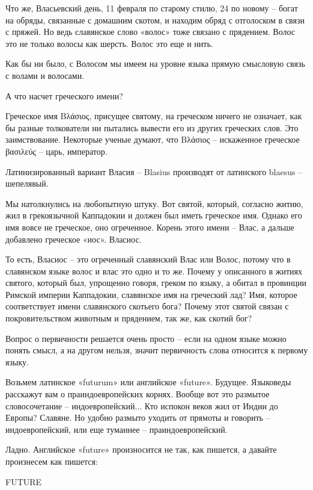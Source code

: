 \documentclass[a5paper,11pt,openany]{article}
\begin{document}
  Что же, Власьевский день, 11 февраля по старому стилю, 24 по новому – богат на обряды, связанные с домашним скотом, и находим обряд с отголоском в связи с пряжей. Но ведь славянское слово «волос» тоже связано с прядением. Волос это не только волосы как шерсть. Волос это еще и нить.

   Как бы ни было, с Волосом мы имеем на уровне языка прямую смысловую связь с волами и волосами.

   А что насчет греческого имени?

  Греческое имя Βλάσιος, присущее святому, на греческом ничего не означает, как бы разные толкователи ни пытались вывести его из других греческих слов. Это заимствование. Некоторые ученые думают, что Βλάσιος – искаженное греческое βασιλεύς – царь, император.

 Латинизированный вариант Власия –  Blasius производят от латинского blaesus – шепелявый.

Мы натолкнулись на любопытную штуку. Вот святой, который, согласно житию, жил в грекоязычной Каппадокии и должен был иметь греческое имя. Однако его имя вовсе не греческое, оно огреченное. Корень этого имени – Влас, а дальше добавлено греческое «иос». Власиос.

   То есть, Власиос – это огреченный славянский Влас или Волос, потому что в славянском языке волос и влас это одно и то же. Почему у описанного в житиях святого, который был, упрощенно говоря, греком по языку, а обитал в провинции Римской империи Каппадокии, славянское имя на греческий лад? Имя, которое соответствует имени славянского скотьего бога? Почему этот святой связан с покровительством животным и прядением, так же, как скотий бог?

  Вопрос о первичности решается очень просто – если на одном языке можно понять смысл, а на другом нельзя, значит первичность слова относится к первому языку.

    Возьмем латинское «futurum» или английское «future». Будущее. Языковеды расскажут вам о праиндоевропейских корнях. Вообще вот это размытое словосочетание – индоевропейский... Кто испокон веков жил от Индии до Европы? Славяне. Но удобно размыто уходить от прямоты и говорить – индоевропейский, или еще туманнее – праиндоевропейский.

    Ладно. Английское «future» произносится не так, как пишется, а давайте произнесем как пишется:\newline

FUTURE\newline
\end{document}

